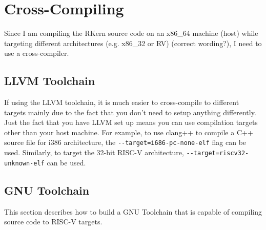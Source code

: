 \section{Cross-Compiling}
Since I am compiling the RKern source code on an x86\_64 machine (host) while targeting different architectures (e.g. x86\_32 or RV) (correct wording?), I need to use a cross-compiler.

\subsection{LLVM Toolchain}
If using the LLVM toolchain, it is much easier to cross-compile to different targets mainly due to the fact that you don't need to setup anything differently. Just the fact that you have LLVM set up means you can use compilation targets other than your host machine.
For example, to use clang++ to compile a C++ source file for i386 architecture, the \verb|--target=i686-pc-none-elf| flag can be used. Similarly, to target the 32-bit RISC-V architecture, \verb|--target=riscv32-unknown-elf| can be used.

\subsection{GNU Toolchain}
This section describes how to build a GNU Toolchain that is capable of compiling source code to RISC-V targets.

